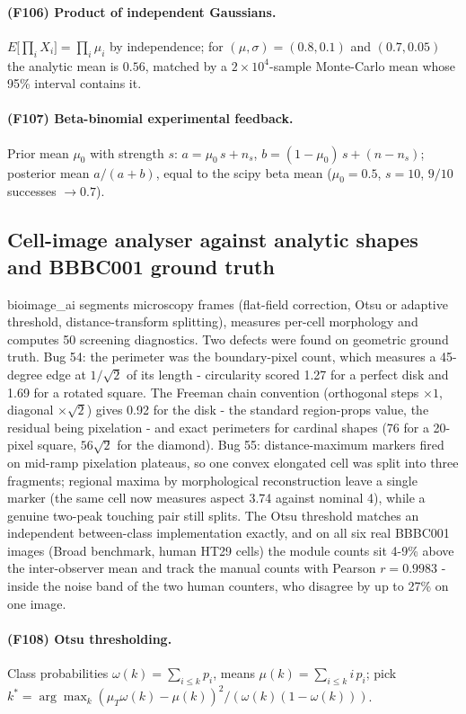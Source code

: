 \paragraph{(F106) Product of independent Gaussians.} $E\big[\prod_{i}X_{i}\big]=\prod_{i}\mu_{i}$ by independence; for $(\mu,\sigma)=(0.8,0.1)$ and $(0.7,0.05)$ the analytic mean is $0.56$, matched by a $2\times10^{4}$-sample Monte-Carlo mean whose 95\% interval contains it.
\paragraph{(F107) Beta-binomial experimental feedback.} Prior mean $\mu_0$ with strength $s$: $a=\mu_{0}\,s+n_{s}$, $b=(1-\mu_{0})\,s+(n-n_{s})$; posterior mean $a/(a+b)$, equal to the scipy beta mean ($\mu_0=0.5$, $s=10$, $9/10$ successes $\to0.7$).
\subsection{Cell-image analyser against analytic shapes and BBBC001 ground truth}
bioimage\_ai segments microscopy frames (flat-field correction, Otsu or adaptive threshold, distance-transform splitting), measures per-cell morphology and computes 50 screening diagnostics. Two defects were found on geometric ground truth. Bug 54: the perimeter was the boundary-pixel count, which measures a 45-degree edge at $1/\sqrt2$ of its length - circularity scored 1.27 for a perfect disk and 1.69 for a rotated square. The Freeman chain convention (orthogonal steps $\times1$, diagonal $\times\sqrt2$) gives 0.92 for the disk - the standard region-props value, the residual being pixelation - and exact perimeters for cardinal shapes (76 for a 20-pixel square, $56\sqrt2$ for the diamond). Bug 55: distance-maximum markers fired on mid-ramp pixelation plateaus, so one convex elongated cell was split into three fragments; regional maxima by morphological reconstruction leave a single marker (the same cell now measures aspect 3.74 against nominal 4), while a genuine two-peak touching pair still splits. The Otsu threshold matches an independent between-class implementation exactly, and on all six real BBBC001 images (Broad benchmark, human HT29 cells) the module counts sit 4-9\% above the inter-observer mean and track the manual counts with Pearson $r=0.9983$ - inside the noise band of the two human counters, who disagree by up to 27\% on one image.
\paragraph{(F108) Otsu thresholding.} Class probabilities $\omega(k)=\sum_{i\le k}p_i$, means $\mu(k)=\sum_{i\le k}i\,p_i$; pick $k^*=\arg\max_k (\mu_T\omega(k)-\mu(k))^2/(\omega(k)(1-\omega(k)))$.

